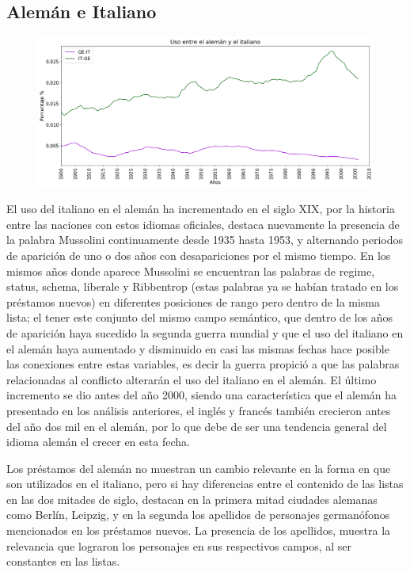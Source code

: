 \newpage
\subsection{Alemán e Italiano}

\begin{figure}[h!]
	\centering
	\includegraphics[scale=.38]{Cap_3/SF_3_S2_GE.png}
	\label{SF_GI}
	\caption{}
\end{figure}

El uso del italiano en el alemán ha incrementado en el siglo XIX, por la historia entre las naciones con estos idiomas oficiales,  destaca nuevamente la presencia de la palabra Mussolini  continuamente desde 1935 hasta 1953, y alternando periodos de aparición de uno o dos años  con desapariciones por el mismo tiempo. En los mismos años donde aparece Mussolini se encuentran las palabras de regime, status, schema, liberale y Ribbentrop  (estas palabras ya se habían tratado en los préstamos nuevos) en diferentes posiciones de rango pero dentro de la misma lista; el tener este conjunto del mismo campo semántico, que dentro de los años de aparición haya sucedido la segunda guerra mundial y que el uso del italiano en el alemán haya aumentado y disminuido en casi las mismas fechas hace posible las conexiones entre estas variables, es decir la guerra propició a que las palabras relacionadas al conflicto alterarán el uso del italiano en el alemán.    El último incremento se dio antes del año 2000,  siendo una característica que el alemán ha presentado en los análisis anteriores, el inglés  y francés también crecieron antes del año dos mil en el alemán, por lo que debe de ser una tendencia general del idioma alemán el crecer en esta fecha. 

Los préstamos del alemán no muestran un cambio relevante en la forma en que son utilizados en el italiano,  pero si hay diferencias entre el contenido de las listas en las dos mitades de siglo,  destacan en la primera mitad ciudades alemanas como Berlín, Leipzig, y en la segunda los apellidos de personajes germanófonos mencionados en los préstamos nuevos.  La presencia de los apellidos, muestra la relevancia que lograron los personajes en sus respectivos campos,  al ser constantes en las listas. 


